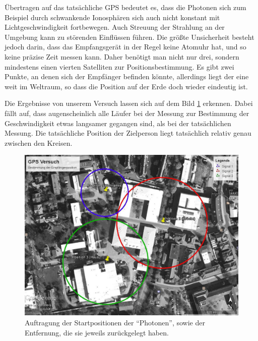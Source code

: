 \documentclass[12pt,a4paper,titlepage,headinclude,bibtotoc]{scrartcl}
\begin{document}
Übertragen auf das tatsächliche GPS bedeutet es, dass die Photonen sich zum Beispiel durch schwankende Ionosphären sich auch nicht konstant mit Lichtgeschwindigkeit fortbewegen.
Auch Streuung der Strahlung an der Umgebung kann zu störenden Einflüssen führen.
Die größte Unsicherheit besteht jedoch darin, dass das Empfangsgerät in der Regel keine Atomuhr hat, und so keine präzise Zeit messen kann.
Daher benötigt man nicht nur drei, sondern mindestens einen vierten Satelliten zur Positionsbestimmung.
Es gibt zwei Punkte, an denen sich der Empfänger befinden könnte, allerdings liegt der eine weit im Weltraum, so dass die Position auf der Erde doch wieder eindeutig ist.

Die Ergebnisse von unserem Versuch lassen sich auf dem Bild \ref{fig:gps} erkennen.
Dabei fällt auf, dass augenscheinlich alle Läufer bei der Messung zur Bestimmung der Geschwindigkeit etwas langsamer gegangen sind, als bei der tatsächlichen Messung.
Die tatsächliche Position der Zielperson liegt tatsächlich relativ genau zwischen den Kreisen.

\begin{figure}[h]
	\centering
	\includegraphics[scale=0.4]{GPS}
	\caption{Auftragung der Startpositionen der "`Photonen"', sowie der Entfernung, die sie jeweils zurückgelegt haben.}
	\label{fig:gps}
\end{figure}
\end{document}
